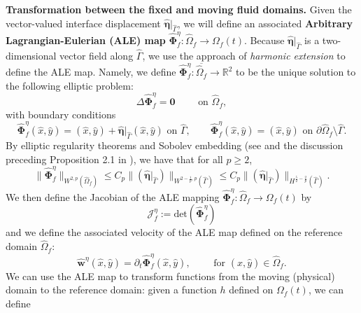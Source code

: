 \documentclass[11pt]{article}
\newcommand{\bd}{\boldsymbol}
\def\R{{\mathbb R}}
\theoremstyle{definition}
\begin{document}
\medskip

\noindent \textbf{Transformation between the fixed and moving fluid domains.} Given the vector-valued interface displacement $\hat{\bd{\eta}}|_{\hat{\Gamma}}$, we will define an associated \textbf{Arbitrary Lagrangian-Eulerian (ALE) map} $\hat{\bd{\Phi}}^{\eta}_{f}: \hat{\Omega}_{f} \to \Omega_{f}(t)$. Because $\hat{\bd{\eta}}|_{\hat{\Gamma}}$ is a two-dimensional vector field along $\hat{\Gamma}$, we use the approach of \textit{harmonic extension} to define the ALE map. Namely, we define $\hat{\bd{\Phi}}^{\eta}_{f}: \overline{\hat{\Omega}_{f}} \to \R^{2}$ to be the unique solution to the following elliptic problem:
\begin{equation}\label{aleeta1}
\Delta \hat{\bd{\Phi}}^{\eta}_{f} = \bd{0} \qquad \text{ on } \hat{\Omega}_{f},
\end{equation}
with boundary conditions
\begin{equation}\label{aleeta2}
\hat{\bd{\Phi}}^{\eta}_{f}(\hat{x}, \hat{y}) = (\hat{x}, \hat{y}) + \hat{\bd{\eta}}|_{\hat{\Gamma}}(\hat{x}, \hat{y}) \text{ on } \hat{\Gamma}, \qquad \hat{\bd{\Phi}}^{\eta}_{f}(\hat{x}, \hat{y}) = (\hat{x}, \hat{y}) \text{ on } \partial \hat{\Omega}_{f} \setminus \hat{\Gamma}.
\end{equation}
By elliptic regularity theorems and Sobolev embedding (see \cite{Grisvard} and the discussion preceding Proposition 2.1 in \cite{Tawri3D}), we have that for all $p \ge 2$, 
\begin{equation*}
\|\hat{\bd{\Phi}}^{\eta}_{f}\|_{W^{2, p}(\hat{\Omega}_{f})} \le C_{p}\|(\hat{\bd{\eta}}|_{\hat{\Gamma}})\|_{W^{2 - \frac{1}{p}, p}(\hat{\Gamma})} \le C_{p}\|(\hat{\bd{\eta}}|_{\hat{\Gamma}})\|_{H^{\frac{5}{2} - \frac{2}{p}}(\hat{\Gamma})}. 
\end{equation*}
We then define the Jacobian of the ALE mapping $\hat{\bd{\Phi}}^{\eta}_{f}: \hat{\Omega}_{f} \to \Omega_{f}(t)$ by
\begin{equation*}
\mathcal{J}^{\eta}_{f} := \text{det}(\hat{\bd{\Phi}}^{\eta}_{f})
\end{equation*}
and we define the associated velocity of the ALE map defined on the reference domain $\hat{\Omega}_{f}$:
\begin{equation}\label{ALEvel}
\hat{\bd{w}}^{\eta}(\hat{x}, \hat{y}) = \partial_{t}\hat{\bd{\Phi}}^{\eta}_{f}(\hat{x}, \hat{y}), \qquad \text{ for } (\hat{x}, \hat{y}) \in \hat{\Omega}_{f}.
\end{equation}
We can use the ALE map to transform functions from the moving (physical) domain to the reference domain: given a function $h$ defined on $\Omega_{f}(t)$, we can define
\end{document}
